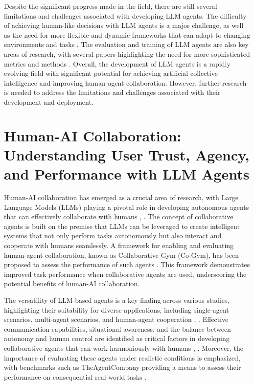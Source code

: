 \documentclass[conference]{IEEEtran}
\begin{document}
Despite the significant progress made in the field, there are still several limitations and challenges associated with developing LLM agents. The difficulty of achieving human-like decisions with LLM agents is a major challenge, as well as the need for more flexible and dynamic frameworks that can adapt to changing environments and tasks \cite{2402.02716, 2411.14033}. The evaluation and training of LLM agents are also key areas of research, with several papers highlighting the need for more sophisticated metrics and methods \cite{2308.03688, 2412.04093}. Overall, the development of LLM agents is a rapidly evolving field with significant potential for achieving artificial collective intelligence and improving human-agent collaboration. However, further research is needed to address the limitations and challenges associated with their development and deployment.

\section{Human-AI Collaboration: Understanding User Trust, Agency, and Performance with LLM Agents}
Human-AI collaboration has emerged as a crucial area of research, with Large Language Models (LLMs) playing a pivotal role in developing autonomous agents that can effectively collaborate with humans \cite{2308.11432}, \cite{2412.15701}. The concept of collaborative agents is built on the premise that LLMs can be leveraged to create intelligent systems that not only perform tasks autonomously but also interact and cooperate with humans seamlessly. A framework for enabling and evaluating human-agent collaboration, known as Collaborative Gym (Co-Gym), has been proposed to assess the performance of such agents \cite{2412.15701}. This framework demonstrates improved task performance when collaborative agents are used, underscoring the potential benefits of human-AI collaboration.

The versatility of LLM-based agents is a key finding across various studies, highlighting their suitability for diverse applications, including single-agent scenarios, multi-agent scenarios, and human-agent cooperation \cite{2309.07864}, \cite{2409.14457}. Effective communication capabilities, situational awareness, and the balance between autonomy and human control are identified as critical factors in developing collaborative agents that can work harmoniously with humans \cite{2401.03428}, \cite{2411.13904}. Moreover, the importance of evaluating these agents under realistic conditions is emphasized, with benchmarks such as TheAgentCompany providing a means to assess their performance on consequential real-world tasks \cite{2412.14161}.
\end{document}
